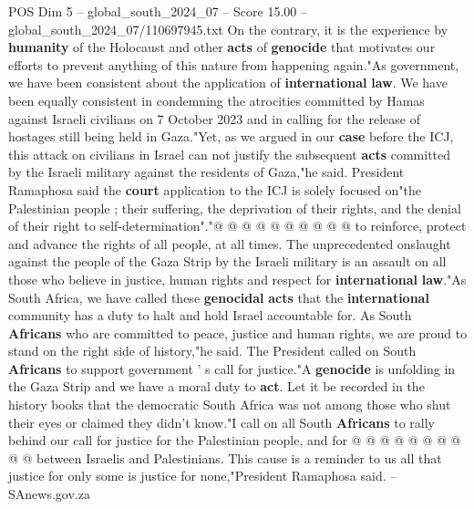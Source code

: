 \begin{textsample}{POS Dim 5 – global\_south\_2024\_07 – Score 15.00 – global\_south\_2024\_07/110697945.txt}
On the contrary, it is the experience by \textbf{humanity} of the Holocaust and other \textbf{acts} of \textbf{genocide} that motivates our efforts to prevent anything of this nature from happening again."As government, we have been consistent about the application of \textbf{international} \textbf{law}.
We have been equally consistent in condemning the atrocities committed by Hamas against Israeli civilians on 7 October 2023 and in calling for the release of hostages still being held in Gaza."Yet, as we argued in our \textbf{case} before the ICJ, this attack on civilians in Israel can not justify the subsequent \textbf{acts} committed by the Israeli military against the residents of Gaza,"he said.
President Ramaphosa said the \textbf{court} application to the ICJ is solely focused on"the Palestinian people ; their suffering, the deprivation of their rights, and the denial of their right to self-determination"."@ @ @ @ @ @ @ @ @ @ to reinforce, protect and advance the rights of all people, at all times.
The unprecedented onslaught against the people of the Gaza Strip by the Israeli military is an assault on all those who believe in justice, human rights and respect for \textbf{international} \textbf{law}."As South Africa, we have called these \textbf{genocidal} \textbf{acts} that the \textbf{international} community has a duty to halt and hold Israel accountable for.
As South \textbf{Africans} who are committed to peace, justice and human rights, we are proud to stand on the right side of history,"he said.
The President called on South \textbf{Africans} to support government ' s call for justice."A \textbf{genocide} is unfolding in the Gaza Strip and we have a moral duty to \textbf{act}.
Let it be recorded in the history books that the democratic South Africa was not among those who shut their eyes or claimed they didn't know."I call on all South \textbf{Africans} to rally behind our call for justice for the Palestinian people, and for @ @ @ @ @ @ @ @ @ @ between Israelis and Palestinians.
This cause is a reminder to us all that justice for only some is justice for none,"President Ramaphosa said. -- SAnews.gov.za

\end{textsample}
